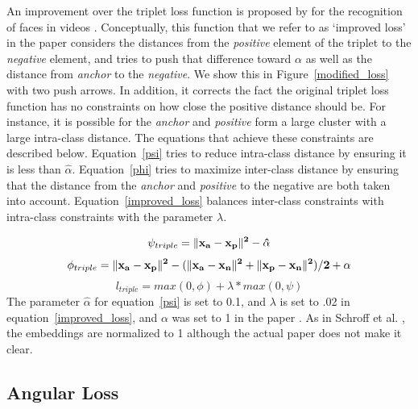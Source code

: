  An improvement over the triplet loss function is proposed by
 \cite{DBLP:conf/cvpr/SchroffKP15} for the recognition of faces in
 videos \cite{Zhang:2016:DML:3088616.3088665}.  Conceptually, this
 function that we refer to as `improved loss' in the paper considers
 the distances from the \textit{positive} element of the triplet to
 the \textit{negative} element, and tries to push that
 difference toward $\alpha$ as well as the distance from
 \textit{anchor} to the \textit{negative}.  We show this in
 Figure~\ref{modified_loss} with two push arrows.  In addition, it corrects the fact the  original triplet loss function has no constraints on how close the positive distance should be.  For instance, it is possible for the \textit{anchor} and \textit{positive} form a large cluster with a large intra-class distance. The equations that achieve these constraints are described below.  Equation~\ref{psi} tries to reduce intra-class distance by ensuring it is less than $\hat{\alpha}$.  Equation~\ref{phi} tries to maximize inter-class distance by ensuring that the distance from the \textit{anchor} and \textit{positive} to the negative are both taken into account.  Equation~\ref{improved_loss} balances inter-class constraints with intra-class constraints with the parameter $\lambda$. 

\begin{equation}
  \psi_{triple} = \|\bf{x_{a}} - \bf{x_{p}}\|^2 - \hat{\alpha}
\label{psi}
\end{equation}
\begin{equation}
  \phi_{triple} = \|\bf{x_{a}} - \bf{x_{p}}\|^2 - (\|\bf{x_{a}}- \bf{x_{n}}\|^2 + \|\bf{x_{p}} - \bf{x_{n}}\|^2) / 2  + \alpha
\label{phi}
\end{equation}
\begin{equation}
  l_{triple} = max(0, \phi) + \lambda * max(0, \psi)
\label{improved_loss}
\end{equation}
The parameter $\hat{\alpha}$ for equation~\ref{psi} is set to 0.1, and $\lambda$ is set to .02 in equation~\ref{improved_loss}, and $\alpha$ was set to 1 in the paper \cite{Zhang:2016:DML:3088616.3088665}.  As in Schroff et al. \cite{DBLP:conf/cvpr/SchroffKP15}, the embeddings are normalized to 1 although the actual paper does not make it clear.

\subsection{Angular Loss}

